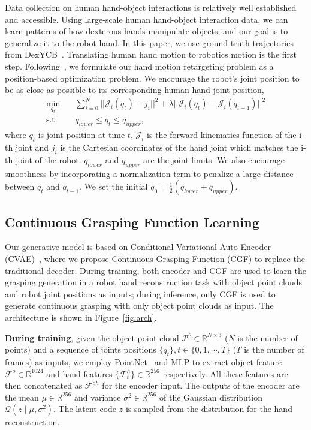 \documentclass[letterpaper, 10 pt, journal, twoside]{IEEEtran}
\begin{document}
Data collection on human hand-object interactions is relatively well established and accessible. Using large-scale human hand-object interaction data, we can learn patterns of how dexterous hands manipulate objects, and our goal is to generalize it to the robot hand. In this paper, we use ground truth trajectories from DexYCB~\cite{chao2021dexycb}. Translating human hand motion to robotics motion is the first step. Following~\cite{qin2022one}, we formulate our hand motion retargeting problem as a position-based optimization problem. We encourage the robot's joint position to be as close as possible to its corresponding human hand joint position,
\begin{equation}
\begin{aligned}
\min_{q_t}& \quad \sum^{N}_{i=0}||\mathcal{J}_i(q_t)-j_i||^2+\lambda ||\mathcal{J}_i(q_t)-\mathcal{J}_i(q_{t-1})||^2 \\
\text{s.t.}& \quad q_{lower} \leq q_t \leq q_{upper},
\end{aligned}
\end{equation}
where $q_t$ is joint position at time $t$, $\mathcal{J}_i$ is the forward kinematics function of the i-th joint and $j_i$ is the Cartesian coordinates of the hand joint which matches the i-th joint of the robot. $q_{lower}$ and $q_{upper}$ are the joint limits. We also encourage smoothness by incorporating a normalization term to penalize a large distance between $q_t$ and $q_{t-1}$. We set the initial $q_0=\frac{1}{2}(q_{lower}+q_{upper})$.

\vspace{-0.05in}
\subsection{Continuous Grasping Function Learning}

Our generative model is based on Conditional Variational Auto-Encoder (CVAE)~\cite{sohn2015learning}, where we propose Continuous Grasping Function (CGF) to replace the traditional decoder. During training, both encoder and CGF are used to learn the grasping generation in a robot hand reconstruction task with object point clouds and robot joint positions as inputs; during inference, only CGF is used to generate continuous grasping with only object point clouds as input. The architecture is shown in Figure~\ref{fig:arch}.

\textbf{During training}, given the object point cloud $\mathcal{P}^{o} \in \mathbb{R}^{N \times 3}$ ($N$ is the number of points) and a sequence of joints positions $\{ q_t \}, t \in \{0, 1, \cdots, T\}$ ($T$ is the number of frames) as inputs, we employ PointNet~\cite{qi2017pointnet} and MLP to extract object feature $\mathcal{F}^{o} \in \mathbb{R}^{1024}$ and hand features $\{\mathcal{F}^{h}_t\} \in \mathbb{R}^{256}$ respectively. All these features are then concatenated as $\mathcal{F}^{oh}$ for the encoder input. The outputs of the encoder are the mean $\mu \in \mathbb{R}^{256}$ and variance $\sigma^{2} \in \mathbb{R}^{256}$ of the Gaussian distribution $\mathcal{Q}\left(z \mid \mu, \sigma^{2}\right)$. The latent code $z$ is sampled from the distribution for the hand reconstruction.
\end{document}

